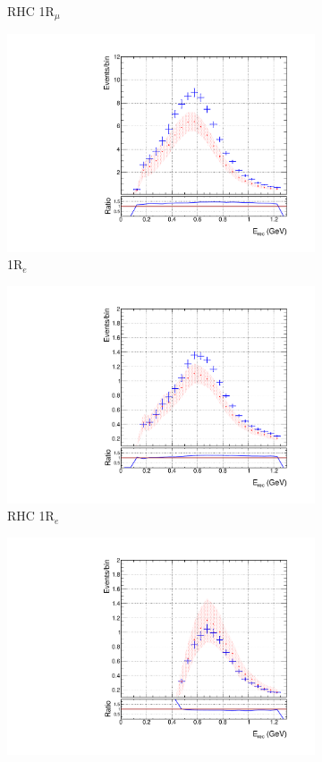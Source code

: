 \begin{figure}[!htbp]
\begin{subfigure}{.49\textwidth}
   \caption{RHC 1R$_{\mu}$}
  \label{fig:skppnumubar}
\end{subfigure}
\begin{subfigure}{.49\textwidth}
  \centering
  \includegraphics[width=0.95\linewidth]{figs/skspecpolynue}
  \caption{1R$_{e}$}
  \label{fig:skppnue}
\end{subfigure}
\begin{subfigure}{.49\textwidth}
  \centering
  \includegraphics[width=0.95\linewidth]{figs/skspecpolynuebar}
   \caption{RHC 1R$_{e}$}
  \label{fig:skppnuebar}
  \end{subfigure}
\begin{subfigure}{.49\textwidth}
  \centering
  \includegraphics[width=0.95\linewidth]{figs/skspecpolynue1pi}

\end{subfigure}
\end{figure}
